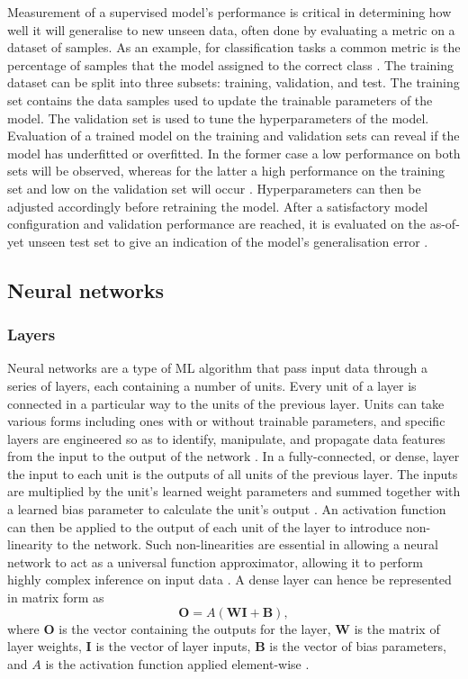 \documentclass[12pt]{article}
\begin{document}
Measurement of a supervised model's performance is critical in determining how well it will generalise to new unseen data, often done by evaluating a metric on a dataset of samples. As an example, for classification tasks a common metric is the percentage of samples that the model assigned to the correct class \cite{Murphy12}. The training dataset can be split into three subsets: training, validation, and test. The training set contains the data samples used to update the trainable parameters of the model. The validation set is used to tune the hyperparameters of the model. Evaluation of a trained model on the training and validation sets can reveal if the model has underfitted or overfitted. In the former case a low performance on both sets will be observed, whereas for the latter a high performance on the training set and low on the validation set will occur \cite{Murphy12, Goodfellow16}. Hyperparameters can then be adjusted accordingly before retraining the model. After a satisfactory model configuration and validation performance are reached, it is evaluated on the as-of-yet unseen test set to give an indication of the model's generalisation error \cite{Murphy12, Goodfellow16}.

\subsection{Neural networks}
\subsubsection{Layers}
Neural networks are a type of ML algorithm that pass input data through a series of layers, each containing a number of units. Every unit of a layer is connected in a particular way to the units of the previous layer. Units can take various forms including ones with or without trainable parameters, and specific layers are engineered so as to identify, manipulate, and propagate data features from the input to the output of the network \cite{Haykin98}. In a fully-connected, or dense, layer the input to each unit is the outputs of all units of the previous layer. The inputs are multiplied by the unit's learned weight parameters and summed together with a learned bias parameter to calculate the unit's output \cite{Goodfellow16, Haykin98}. An activation function can then be applied to the output of each unit of the layer to introduce non-linearity to the network. Such non-linearities are essential in allowing a neural network to act as a universal function approximator, allowing it to perform highly complex inference on input data \cite{Hornik89}. A dense layer can hence be represented in matrix form as
\begin{equation}
\bm{O}=A(\bm{W}\bm{I}+\bm{B}), \label{dense}
\end{equation}
where $\bm{O}$ is the vector containing the outputs for the layer, $\bm{W}$ is the matrix of layer weights, $\bm{I}$ is the vector of layer inputs, $\bm{B}$ is the vector of bias parameters, and $A$ is the activation function applied element-wise \cite{Goodfellow16, Haykin98}.
\end{document}
